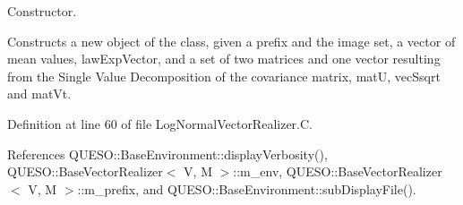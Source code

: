 Constructor. 

Constructs a new object of the class, given a prefix and the image set, a vector of mean values, {\ttfamily law\-Exp\-Vector}, and a set of two matrices and one vector resulting from the Single Value Decomposition of the covariance matrix, {\ttfamily mat\-U}, {\ttfamily vec\-Ssqrt} and {\ttfamily mat\-Vt}. 

Definition at line 60 of file Log\-Normal\-Vector\-Realizer.\-C.



References Q\-U\-E\-S\-O\-::\-Base\-Environment\-::display\-Verbosity(), Q\-U\-E\-S\-O\-::\-Base\-Vector\-Realizer$<$ V, M $>$\-::m\-\_\-env, Q\-U\-E\-S\-O\-::\-Base\-Vector\-Realizer$<$ V, M $>$\-::m\-\_\-prefix, and Q\-U\-E\-S\-O\-::\-Base\-Environment\-::sub\-Display\-File().



